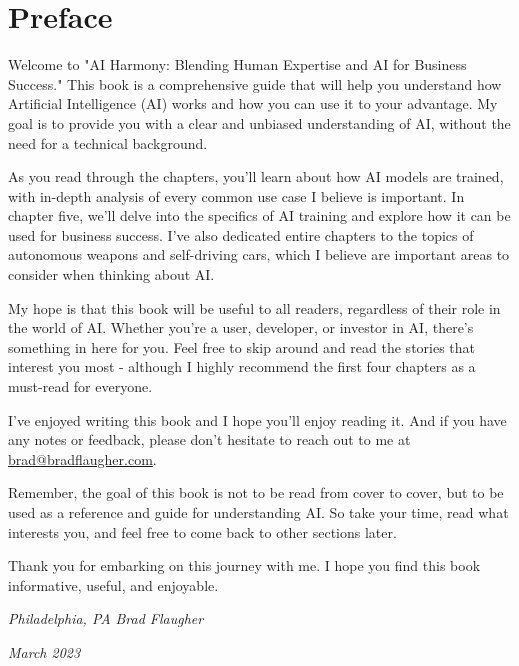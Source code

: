 \let\cleardoublepage\clearpage
\chapter*{Preface}

Welcome to "AI Harmony: Blending Human Expertise and AI for Business Success." This book is a comprehensive guide that will help you understand how Artificial Intelligence (AI) works and how you can use it to your advantage. My goal is to provide you with a clear and unbiased understanding of AI, without the need for a technical background.

As you read through the chapters, you'll learn about how AI models are trained, with in-depth analysis of every common use case I believe is important. In chapter five, we'll delve into the specifics of AI training and explore how it can be used for business success. I've also dedicated entire chapters to the topics of autonomous weapons and self-driving cars, which I believe are important areas to consider when thinking about AI.

My hope is that this book will be useful to all readers, regardless of their role in the world of AI. Whether you're a user, developer, or investor in AI, there's something in here for you. Feel free to skip around and read the stories that interest you most - although I highly recommend the first four chapters as a must-read for everyone.

I've enjoyed writing this book and I hope you'll enjoy reading it. And if you have any notes or feedback, please don't hesitate to reach out to me at \href{mailto:brad@bradflaugher.com}{brad@bradflaugher.com}.

Remember, the goal of this book is not to be read from cover to cover, but to be used as a reference and guide for understanding AI. So take your time, read what interests you, and feel free to come back to other sections later.

Thank you for embarking on this journey with me. I hope you find this book informative, useful, and enjoyable.

\textit{Philadelphia, PA} \hfill \textit{Brad Flaugher}

\textit{March 2023}


